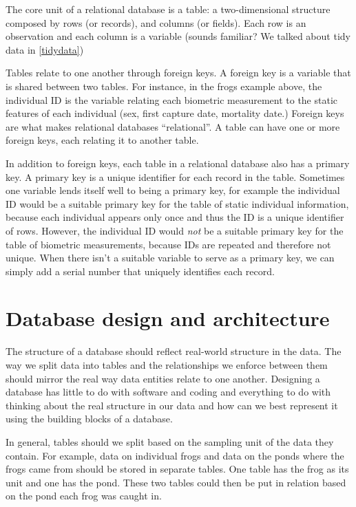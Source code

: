 \documentclass[
]{book}
\begin{document}
The core unit of a relational database is a table: a two-dimensional structure composed by rows (or records), and columns (or fields). Each row is an observation and each column is a variable (sounds familiar? We talked about tidy data in \ref{tidydata})

Tables relate to one another through foreign keys. A foreign key is a variable that is shared between two tables. For instance, in the frogs example above, the individual ID is the variable relating each biometric measurement to the static features of each individual (sex, first capture date, mortality date.) Foreign keys are what makes relational databases ``relational''. A table can have one or more foreign keys, each relating it to another table.

In addition to foreign keys, each table in a relational database also has a primary key. A primary key is a unique identifier for each record in the table. Sometimes one variable lends itself well to being a primary key, for example the individual ID would be a suitable primary key for the table of static individual information, because each individual appears only once and thus the ID is a unique identifier of rows. However, the individual ID would \emph{not} be a suitable primary key for the table of biometric measurements, because IDs are repeated and therefore not unique. When there isn't a suitable variable to serve as a primary key, we can simply add a serial number that uniquely identifies each record.

\hypertarget{database-design-and-architecture}{%
\section{Database design and architecture}\label{database-design-and-architecture}}

The structure of a database should reflect real-world structure in the data. The way we split data into tables and the relationships we enforce between them should mirror the real way data entities relate to one another. Designing a database has little to do with software and coding and everything to do with thinking about the real structure in our data and how can we best represent it using the building blocks of a database.

In general, tables should we split based on the sampling unit of the data they contain. For example, data on individual frogs and data on the ponds where the frogs came from should be stored in separate tables. One table has the frog as its unit and one has the pond. These two tables could then be put in relation based on the pond each frog was caught in.
\end{document}
